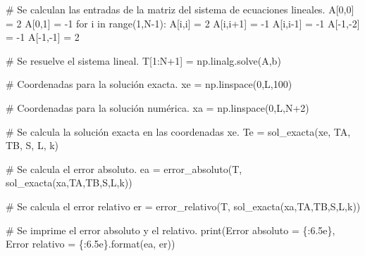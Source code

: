 \documentclass[
  letterpaper,
  DIV=11,
  numbers=noendperiod]{scrreprt}
\newenvironment{Shaded}{\begin{snugshade}}{\end{snugshade}}
\newcommand{\BuiltInTok}[1]{\textcolor[rgb]{0.00,0.23,0.31}{#1}}
\newcommand{\CommentTok}[1]{\textcolor[rgb]{0.37,0.37,0.37}{#1}}
\newcommand{\ControlFlowTok}[1]{\textcolor[rgb]{0.00,0.23,0.31}{#1}}
\newcommand{\DecValTok}[1]{\textcolor[rgb]{0.68,0.00,0.00}{#1}}
\newcommand{\KeywordTok}[1]{\textcolor[rgb]{0.00,0.23,0.31}{#1}}
\newcommand{\NormalTok}[1]{\textcolor[rgb]{0.00,0.23,0.31}{#1}}
\newcommand{\OperatorTok}[1]{\textcolor[rgb]{0.37,0.37,0.37}{#1}}
\newcommand{\SpecialCharTok}[1]{\textcolor[rgb]{0.37,0.37,0.37}{#1}}
\newcommand{\StringTok}[1]{\textcolor[rgb]{0.13,0.47,0.30}{#1}}
\begin{document}
\begin{Shaded}
\begin{Highlighting}[]
    \CommentTok{\# Se calculan las entradas de la matriz del sistema de ecuaciones lineales.}
\NormalTok{    A[}\DecValTok{0}\NormalTok{,}\DecValTok{0}\NormalTok{] }\OperatorTok{=} \DecValTok{2}
\NormalTok{    A[}\DecValTok{0}\NormalTok{,}\DecValTok{1}\NormalTok{] }\OperatorTok{=} \OperatorTok{{-}}\DecValTok{1}
    \ControlFlowTok{for}\NormalTok{ i }\KeywordTok{in} \BuiltInTok{range}\NormalTok{(}\DecValTok{1}\NormalTok{,N}\OperatorTok{{-}}\DecValTok{1}\NormalTok{):}
\NormalTok{        A[i,i] }\OperatorTok{=} \DecValTok{2}
\NormalTok{        A[i,i}\OperatorTok{+}\DecValTok{1}\NormalTok{] }\OperatorTok{=} \OperatorTok{{-}}\DecValTok{1}
\NormalTok{        A[i,i}\OperatorTok{{-}}\DecValTok{1}\NormalTok{] }\OperatorTok{=} \OperatorTok{{-}}\DecValTok{1}
\NormalTok{    A[}\OperatorTok{{-}}\DecValTok{1}\NormalTok{,}\OperatorTok{{-}}\DecValTok{2}\NormalTok{] }\OperatorTok{=} \OperatorTok{{-}}\DecValTok{1}
\NormalTok{    A[}\OperatorTok{{-}}\DecValTok{1}\NormalTok{,}\OperatorTok{{-}}\DecValTok{1}\NormalTok{] }\OperatorTok{=} \DecValTok{2}

    \CommentTok{\# Se resuelve el sistema lineal.}
\NormalTok{    T[}\DecValTok{1}\NormalTok{:N}\OperatorTok{+}\DecValTok{1}\NormalTok{] }\OperatorTok{=}\NormalTok{ np.linalg.solve(A,b)}

    \CommentTok{\# Coordenadas para la solución exacta.}
\NormalTok{    xe }\OperatorTok{=}\NormalTok{ np.linspace(}\DecValTok{0}\NormalTok{,L,}\DecValTok{100}\NormalTok{)}
    
    \CommentTok{\# Coordenadas para la solución numérica.}
\NormalTok{    xa }\OperatorTok{=}\NormalTok{ np.linspace(}\DecValTok{0}\NormalTok{,L,N}\OperatorTok{+}\DecValTok{2}\NormalTok{)}
    
    \CommentTok{\# Se calcula la solución exacta en las coordenadas xe.}
\NormalTok{    Te }\OperatorTok{=}\NormalTok{ sol\_exacta(xe, TA, TB, S, L, k)}
    
    \CommentTok{\# Se calcula el error absoluto.}
\NormalTok{    ea }\OperatorTok{=}\NormalTok{ error\_absoluto(T, sol\_exacta(xa,TA,TB,S,L,k))}
    
    \CommentTok{\# Se calcula el error relativo}
\NormalTok{    er }\OperatorTok{=}\NormalTok{ error\_relativo(T, sol\_exacta(xa,TA,TB,S,L,k))}

    \CommentTok{\# Se imprime el error absoluto y el relativo.}
    \BuiltInTok{print}\NormalTok{(}\StringTok{\textquotesingle{}Error absoluto = }\SpecialCharTok{\{:6.5e\}}\StringTok{, Error relativo = }\SpecialCharTok{\{:6.5e\}}\StringTok{\textquotesingle{}}\NormalTok{.}\BuiltInTok{format}\NormalTok{(ea, er))}


\end{Highlighting}
\end{Shaded}
\end{document}
